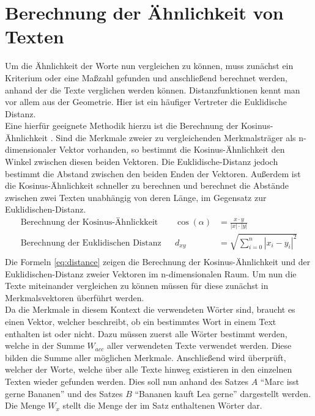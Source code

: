 \section{Berechnung der Ähnlichkeit von Texten}
\label{chap:berechnung_texteahnlichkeit}
Um die Ähnlichkeit der Worte nun vergleichen zu können, muss zunächst ein Kriterium oder eine Maßzahl gefunden und anschließend berechnet werden, anhand der die Texte verglichen werden können. Distanzfunktionen kennt man vor allem aus der Geometrie. Hier ist ein häufiger Vertreter die Euklidische Distanz. \\ \newline
Eine hierfür geeignete Methodik hierzu ist die Berechnung der Kosinus-Ähnlichkeit \cite[2]{Godfrey.21.08.2014}. Sind die Merkmale zweier zu vergleichenden Merkmalsträger als n-dimensionaler Vektor vorhanden, so bestimmt die Kosinus-Ähnlichkeit den Winkel zwischen diesen beiden Vektoren. Die Euklidische-Distanz jedoch  bestimmt die Abstand zwischen den beiden Enden der Vektoren. Außerdem ist die Kosinus-Ähnlichkeit schneller zu berechnen und berechnet die Abstände zwischen zwei Texten unabhängig von deren Länge, im Gegensatz zur Euklidischen-Distanz.
\begin{equation}
	\begin{aligned} 
		\text{Berechnung der Kosinus-Ähnlickkeit}&& 
		\cos(\alpha)&=\frac{x\cdot y}{\left|x\right|\cdot \left|y\right|} \\
		\text{Berechnung der Euklidischen Distanz}&& 
		{d}_{xy}&=\sqrt{\sum _{i=0}^{n}{\left|{x}_{i}-{y}_{i}\right|}^{2}} \\  
	\end{aligned} 
	\label{eq:distance}
\end{equation}
Die Formeln \eqref{eq:distance} zeigen die Berechnung der Kosinus-Ähnlichkeit und der Euklidischen-Distanz zweier Vektoren im n-dimensionalen Raum. Um nun die Texte miteinander vergleichen zu können müssen für diese zunächst in Merkmalsvektoren überführt werden. \\ \newline
Da die Merkmale in diesem Kontext die verwendeten Wörter sind, braucht es einen Vektor, welcher beschreibt, ob ein bestimmtes Wort in einem Text enthalten ist oder nicht. Dazu müssen zuerst alle Wörter bestimmt werden, welche in der Summe $W_{acc}$ aller verwendeten Texte verwendet werden. Diese bilden die Summe aller möglichen Merkmale. Anschließend wird überprüft, welcher der Worte, welche über alle Texte hinweg existieren in den einzelnen Texten wieder gefunden werden. Dies soll nun anhand des Satzes $A$ "`Marc isst gerne Bananen"' und des Satzes $B$ "`Bananen kauft Lea gerne"' dargestellt werden. Die Menge $W_{x}$ stellt die Menge der im Satz enthaltenen Wörter dar. 
